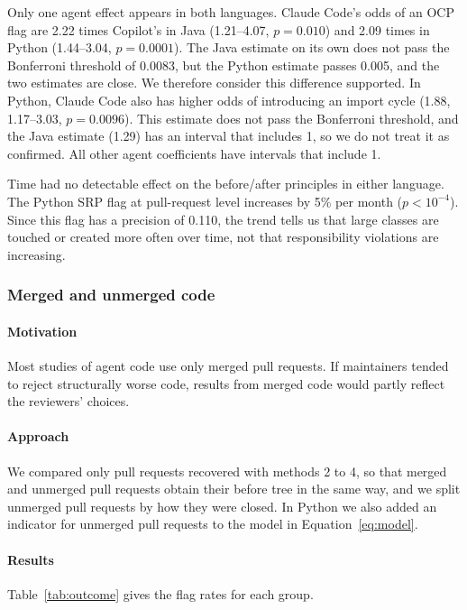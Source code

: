 \documentclass[sigconf]{acmart}
\begin{document}
Only one agent effect appears in both languages. Claude Code's odds of an OCP flag are 2.22 times
Copilot's in Java (1.21--4.07, $p = 0.010$) and 2.09 times in Python (1.44--3.04, $p = 0.0001$).
The Java estimate on its own does not pass the Bonferroni threshold of 0.0083, but the Python estimate
passes 0.005, and the two estimates are close. We therefore consider this difference supported. In
Python, Claude Code also has higher odds of introducing an import cycle (1.88, 1.17--3.03,
$p = 0.0096$). This estimate does not pass the Bonferroni threshold, and the Java estimate (1.29) has
an interval that includes 1, so we do not treat it as confirmed. All other agent coefficients have
intervals that include 1.

Time had no detectable effect on the before/after principles in either language. The Python SRP flag
at pull-request level increases by 5\% per month ($p < 10^{-4}$). Since this flag has a precision of
0.110, the trend tells us that large classes are touched or created more often over time, not that
responsibility violations are increasing.

\subsubsection{Merged and unmerged code}
\label{sec:outcome}

\paragraph{Motivation} Most studies of agent code use only merged pull requests. If maintainers tended
to reject structurally worse code, results from merged code would partly reflect the reviewers'
choices.

\paragraph{Approach} We compared only pull requests recovered with methods 2 to 4, so that merged and
unmerged pull requests obtain their before tree in the same way, and we split unmerged pull requests
by how they were closed. In Python we also added an indicator for unmerged pull requests to the
model in Equation~\eqref{eq:model}.

\paragraph{Results} Table~\ref{tab:outcome} gives the flag rates for each group.
\end{document}
